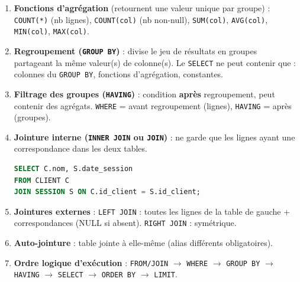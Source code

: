 \documentclass[11pt]{article}
\begin{document}
\begin{methode}
\begin{enumerate}
\item \textbf{Fonctions d'agrégation} (retournent une valeur unique par groupe) :
\texttt{COUNT(*)} (nb lignes), \texttt{COUNT(col)} (nb non-null), \texttt{SUM(col)}, \texttt{AVG(col)}, \texttt{MIN(col)}, \texttt{MAX(col)}.
\item \textbf{Regroupement (\texttt{GROUP BY})} : divise le jeu de résultats en groupes partageant la même valeur(s) de colonne(s). Le \texttt{SELECT} ne peut contenir que : colonnes du \texttt{GROUP BY}, fonctions d'agrégation, constantes.
\item \textbf{Filtrage des groupes (\texttt{HAVING})} : condition \textbf{après} regroupement, peut contenir des agrégats. \texttt{WHERE} = avant regroupement (lignes), \texttt{HAVING} = après (groupes).
\item \textbf{Jointure interne (\texttt{INNER JOIN} ou \texttt{JOIN})} : ne garde que les lignes ayant une correspondance dans les deux tables.
\begin{lstlisting}[language=SQL]
SELECT C.nom, S.date_session
FROM CLIENT C
JOIN SESSION S ON C.id_client = S.id_client;
\end{lstlisting}
\item \textbf{Jointures externes} :
\texttt{LEFT JOIN} : toutes les lignes de la table de gauche + correspondances (NULL si absent).
\texttt{RIGHT JOIN} : symétrique.
\item \textbf{Auto-jointure} : table jointe à elle-même (alias différents obligatoires).
\item \textbf{Ordre logique d'exécution} : \texttt{FROM/JOIN} $\to$ \texttt{WHERE} $\to$ \texttt{GROUP BY} $\to$ \texttt{HAVING} $\to$ \texttt{SELECT} $\to$ \texttt{ORDER BY} $\to$ \texttt{LIMIT}.
\end{enumerate}
\end{methode}
\end{document}
